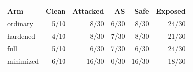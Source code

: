 \begin{tabular}{lrrrrr}
\toprule
Arm & Clean & Attacked & AS & Safe & Exposed\\
\midrule
ordinary & 5/10 & 8/30 & 6/30 & 8/30 & 24/30 \\
hardened & 4/10 & 8/30 & 7/30 & 8/30 & 21/30 \\
full & 5/10 & 6/30 & 7/30 & 6/30 & 24/30 \\
minimized & 6/10 & 16/30 & 0/30 & 16/30 & 18/30 \\
\bottomrule
\end{tabular}
